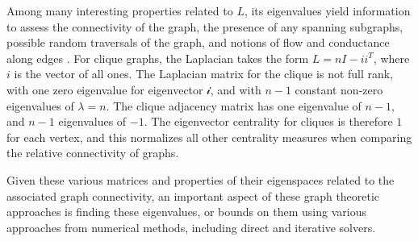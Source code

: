 \documentclass[12pt,letterpaper]{article}
\begin{document}
Among many interesting properties related to $L$, its eigenvalues yield information to assess the connectivity of the graph, the presence of any spanning subgraphs, possible random traversals of the graph, and notions of flow and conductance along edges \cite{Chung1996}. For clique graphs, the Laplacian takes the form $L = nI - ii^T$, where $i$ is the vector of all ones. The Laplacian matrix for the clique is not full rank, with one zero eigenvalue for eigenvector $\mathcal{i}$, and with $n-1$ constant non-zero eigenvalues of $\lambda = n$. The clique adjacency matrix has one eigenvalue of $n-1$, and $n-1$ eigenvalues of $-1$. The eigenvector centrality for cliques is therefore $1$ for each vertex, and this normalizes all other centrality measures when comparing the relative connectivity of graphs.

Given these various matrices and properties of their eigenspaces related to the associated graph connectivity, an important aspect of these graph theoretic approaches is finding these eigenvalues, or bounds on them using various approaches from numerical methods, including direct and iterative solvers.






\newpage


\end{document}
